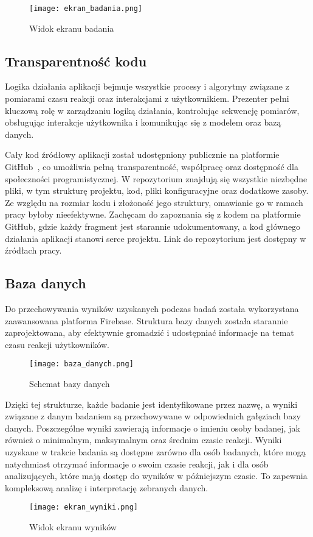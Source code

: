 \begin{figure}[!htb]
    \centering
    \texttt{[image: ekran\_badania.png]}
    \caption{Widok ekranu badania}
\end{figure}
\subsection{Transparentność kodu}
Logika działania aplikacji bejmuje wszystkie procesy i algorytmy związane z pomiarami czasu reakcji oraz interakcjami z użytkownikiem. Prezenter pełni kluczową rolę w zarządzaniu logiką działania, kontrolując sekwencję pomiarów, obsługując interakcje użytkownika i komunikując się z modelem oraz bazą danych. 

Cały kod źródłowy aplikacji został udostępniony publicznie na platformie GitHub~\cite{github}, co umożliwia pełną transparentność, współpracę oraz dostępność dla społeczności programistycznej. W repozytorium znajdują się wszystkie niezbędne pliki, w tym strukturę projektu, kod, pliki konfiguracyjne oraz dodatkowe zasoby. Ze względu na rozmiar kodu i złożoność jego struktury, omawianie go w ramach pracy byłoby nieefektywne. Zachęcam do zapoznania się z kodem na platformie GitHub, gdzie każdy fragment jest starannie udokumentowany, a kod głównego działania aplikacji stanowi serce projektu. Link do repozytorium jest dostępny w źródłach pracy.
\subsection{Baza danych}
Do przechowywania wyników uzyskanych podczas badań została wykorzystana zaawansowana platforma Firebase. Struktura bazy danych została starannie zaprojektowana, aby efektywnie gromadzić i udostępniać informacje na temat czasu reakcji użytkowników.

\begin{figure}[!htb]
    \centering
    \texttt{[image: baza\_danych.png]}
    \caption{Schemat bazy danych}
\end{figure}

Dzięki tej strukturze, każde badanie jest identyfikowane przez nazwę, a wyniki związane z danym badaniem są przechowywane w odpowiednich gałęziach bazy danych. Poszczególne wyniki zawierają informacje o imieniu osoby badanej, jak również o minimalnym, maksymalnym oraz średnim czasie reakcji.
Wyniki uzyskane w trakcie badania są dostępne zarówno dla osób badanych, które mogą natychmiast otrzymać informacje o swoim czasie reakcji, jak i dla osób analizujących, które mają dostęp do wyników w późniejszym czasie. To zapewnia kompleksową analizę i interpretację zebranych danych.
\begin{figure}[!htb]
    \centering
    \texttt{[image: ekran\_wyniki.png]}
    \caption{Widok ekranu wyników}
\end{figure}

